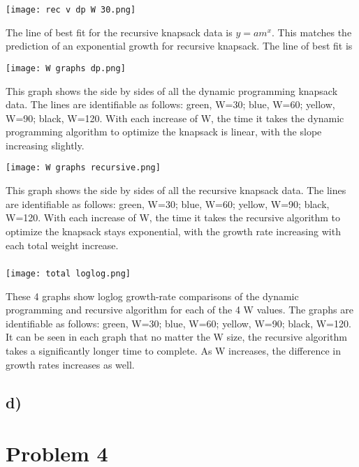 \documentclass{article}
\begin{document}
\texttt{[image: rec v dp W 30.png]}

The line of best fit for the recursive knapsack data is $y = am^x$.  This matches the prediction of an exponential growth for recursive knapsack.  The line of best fit is 

\texttt{[image: W graphs dp.png]}

This graph shows the side by sides of all the dynamic programming knapsack data.  The lines are identifiable as follows: green, W=30; blue, W=60; yellow, W=90; black, W=120.  With each increase of W, the time it takes the dynamic programming algorithm to optimize the knapsack is linear, with the slope increasing slightly.

\texttt{[image: W graphs recursive.png]}

This graph shows the side by sides of all the recursive knapsack data.  The lines are identifiable as follows: green, W=30; blue, W=60; yellow, W=90; black, W=120.  With each increase of W, the time it takes the recursive algorithm to optimize the knapsack stays exponential, with the growth rate increasing with each total weight increase.

\subsubsection*{}

\texttt{[image: total loglog.png]}

These 4 graphs show loglog growth-rate comparisons of the dynamic programming and recursive algorithm for each of the 4 W values. The graphs are identifiable as follows: green, W=30; blue, W=60; yellow, W=90; black, W=120.  It can be seen in each graph that no matter the W size, the recursive algorithm takes a significantly longer time to complete.  As W increases, the difference in growth rates increases as well.

\subsection*{d)}

\section*{Problem 4}
\end{document}
